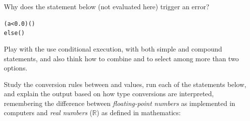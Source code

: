 \documentclass[krantz2]{krantz}\usepackage{knitr}%
\begin{document}
Why does the statement below (not evaluated here) trigger an error?

\begin{knitrout}\footnotesize
{}\color{fgcolor}\begin{kframe}
\begin{alltt}
 (a < 0.0) ()
else ()
\end{alltt}
\end{kframe}
\end{knitrout}

\begin{playground}
Play with the use conditional execution, with both simple and compound statements, and also think how to combine  and  to select among more than two options.
\end{playground}

\begin{playground}
Study the conversion rules between  and  values, run each of the statements below, and explain the output based on how type conversions are interpreted, remembering the difference between \emph{floating-point numbers} as implemented in computers and \emph{real numbers} ($\mathbb{R}$) as defined in mathematics:

\begin{knitrout}\footnotesize
{}\color{fgcolor}\begin{kframe}
\begin{alltt}
 \hlstd{(}\hlstd{)} \hlstd{(}\hlstd{)}
 \hlstd{(}\hlopt{-}\hlstd{)} \hlstd{(}\hlstd{)}
 \hlstd{(}\hlstd{)} \hlstd{(}\hlstd{)}
 \hlstd{(}\hlstd{)} \hlstd{(}\hlstd{)}
 \hlstd{(}\hlstd{)} \hlstd{(}\hlstd{)}
 \hlstd{(}\hlstd{)} \hlstd{(}\hlstd{)}
 \hlstd{(}\hlstd{)} \hlstd{(}\hlstd{)}
 \hlstd{(}\hlstd{(}\hlstd{))} \hlstd{(}\hlstd{)}
 \hlstd{(}\hlstd{(}\hlstd{(}\hlstd{)))} \hlstd{(}\hlstd{)}
 \hlstd{(}\hlstd{(}\hlstd{))} \hlstd{(}\hlstd{)}
 \hlstd{(}\hlstd{)} \hlstd{(}\hlstd{)}
\end{alltt}
\end{kframe}
\end{knitrout}

\end{playground}
\end{document}
